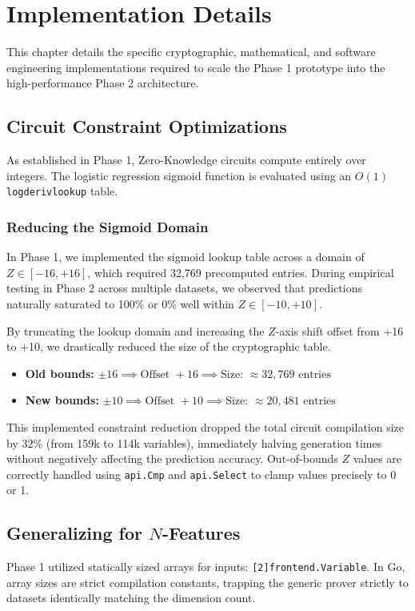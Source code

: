 \chapter{Implementation Details}

This chapter details the specific cryptographic, mathematical, and software engineering implementations required to scale the Phase 1 prototype into the high-performance Phase 2 architecture.

\section{Circuit Constraint Optimizations}
As established in Phase 1, Zero-Knowledge circuits compute entirely over integers. The logistic regression sigmoid function is evaluated using an $O(1)$ \texttt{logderivlookup} table. 

\subsection{Reducing the Sigmoid Domain}
In Phase 1, we implemented the sigmoid lookup table across a domain of $Z \in [-16, +16]$, which required 32,769 precomputed entries. During empirical testing in Phase 2 across multiple datasets, we observed that predictions naturally saturated to 100\% or 0\% well within $Z \in [-10, +10]$.

By truncating the lookup domain and increasing the $Z$-axis shift offset from +16 to +10, we drastically reduced the size of the cryptographic table.
\begin{itemize}
    \item \textbf{Old bounds:} $\pm 16 \implies \text{Offset } +16 \implies \text{Size: } \approx 32,769 \text{ entries}$
    \item \textbf{New bounds:} $\pm 10 \implies \text{Offset } +10 \implies \text{Size: } \approx 20,481 \text{ entries}$
\end{itemize}
This implemented constraint reduction dropped the total circuit compilation size by 32\% (from 159k to 114k variables), immediately halving generation times without negatively affecting the prediction accuracy. Out-of-bounds $Z$ values are correctly handled using \texttt{api.Cmp} and \texttt{api.Select} to clamp values precisely to 0 or 1.

\section{Generalizing for $N$-Features}
Phase 1 utilized statically sized arrays for inputs: \texttt{[2]frontend.Variable}. In Go, array sizes are strict compilation constants, trapping the generic prover strictly to datasets identically matching the dimension count.

